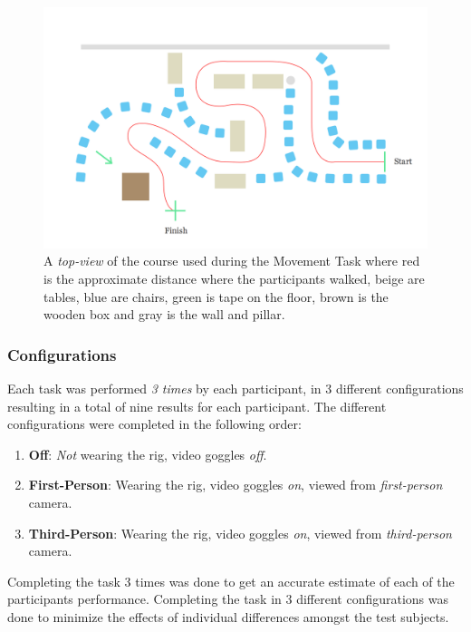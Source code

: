 \documentclass[runningheads,a4paper,oribibl]{llncs}
\begin{document}
\begin{figure}
   \centering
   \includegraphics[width=\textwidth]{ExternalMaterial/Course-top}
   \caption{A \emph{top-view} of the course used during the Movement Task where red is the approximate distance where the participants walked, beige are tables, blue are chairs, green is tape on the floor, brown is the wooden box and gray is the wall and pillar.} \label{fig:CourseTop}
\end{figure}


\subsubsection{Configurations} \label{subsubsec:Configurations}
Each task was performed \emph{3 times} by each participant, in 3 different configurations resulting in a total of nine results for each participant. The different configurations were completed in the following order:
\begin{enumerate}
	\item \textbf{Off}: \emph{Not} wearing the rig, video goggles \emph{off}.
	\item \textbf{First-Person}: Wearing the rig, video goggles \emph{on}, viewed from \emph{first-person} camera.
	\item \textbf{Third-Person}: Wearing the rig, video goggles \emph{on}, viewed from \emph{third-person} camera.
\end{enumerate} 

Completing the task 3 times was done to get an accurate estimate of each of the participants performance. Completing the task in 3 different configurations was done to minimize the effects of individual differences amongst the test subjects. 
\end{document}

